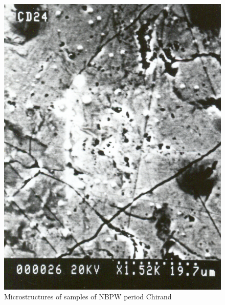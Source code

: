 \begin{figure}[H]
\renewcommand{\thefigure}{25C}
\includegraphics[scale=0.65]{images/chapter-4/fig025C.jpg}
\caption{Microstructures of samples of NBPW period Chirand}\label{chapter-4-fig25C}
\end{figure}

